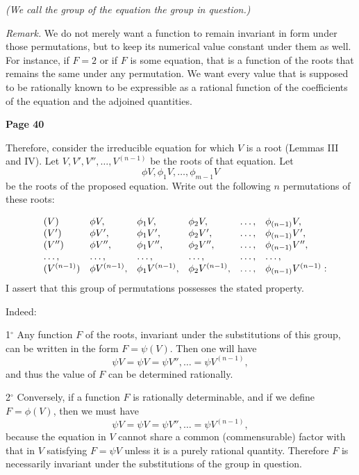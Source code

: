 \documentclass{article}
\begin{document}
\medskip

\noindent
\emph{(We call the group of the equation the group in question.)}

\smallskip

\noindent
\emph{Remark.} We do not merely want a function to remain invariant in form under those permutations, but to keep its numerical value constant under them as well. For instance, if \(F = 2\) or if \(F\) is some equation, that is a function of the roots that remains the same under any permutation. We want every value that is supposed to be rationally known to be expressible as a rational function of the coefficients of the equation and the adjoined quantities.

\bigskip

\noindent
\centerline{\textbf{Page 40}}

\medskip

\noindent
Therefore, consider the irreducible equation for which \(V\) is a root (Lemmas III and IV). Let \(V, V', V'', \dots, V^{(n-1)}\) be the roots of that equation. Let 
\[\phi V, \phi_1 V, \dots, \phi_{m-1} V\]
be the roots of the proposed equation. Write out the following \(n\) permutations of these roots:

\[
\begin{array}{l l l l l l l}
&(V) & \phi V, & \phi_1 V, & \phi_2 V, & \dots, & \phi_{(n-1)} V, \\
&(V') & \phi V', & \phi_1 V', & \phi_2 V', & \dots, & \phi_{(n-1)} V', \\
&(V'') & \phi V'', & \phi_1 V'', & \phi_2 V'', & \dots, & \phi_{(n-1)} V'', \\
&\dots,&\dots,&\dots,&\dots,&\dots,&\dots, \\
&(V^{(n-1)}) & \phi V^{(n-1)}, & \phi_1 V^{(n-1)}, & \phi_2 V^{(n-1)}, & \dots, & \phi_{(n-1)}V^{(n-1)}:
\end{array}
\]
\noindent
I assert that this group of permutations possesses the stated property. 

\smallskip

Indeed:

\smallskip


1\(^\circ\) Any function \(F\) of the roots, invariant under the substitutions of this group, can be written in the form
$
F = \psi(V).
$
Then one will have
\[
\psi V = \psi V = \psi V'', \dots = \psi V^{(n-1)},
\]
and thus the value of \(F\) can be determined rationally.

\smallskip


2\(^\circ\) Conversely, if a function \(F\) is rationally determinable, and if we define \(F = \phi(V)\), then we must have
\[
\psi V = \psi V = \psi V'', \dots = \psi V^{(n-1)},
\]
because the equation in \(V\) cannot share a common (commensurable) factor with that in \(V\) satisfying \(F = \psi V\) unless it is a purely rational quantity. Therefore \(F\) is necessarily invariant under the substitutions of the group in question.
\end{document}
